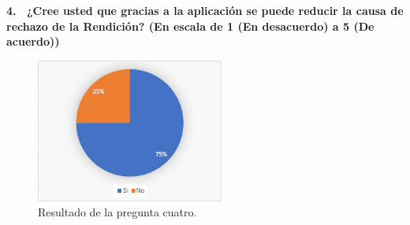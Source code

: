 \newpage
\textbf{4.  ¿Cree usted que gracias a la aplicación se puede reducir la causa de rechazo de la Rendición? (En escala de 1 (En desacuerdo) a 5 (De acuerdo))}

\begin{figure}[h!]
    \centering
    \includegraphics[width=0.55\textwidth]{Imagenes/Pregunta4.png}
    \caption{\label{fig: Pregunta4}Resultado de la pregunta cuatro.}
\end{figure}
